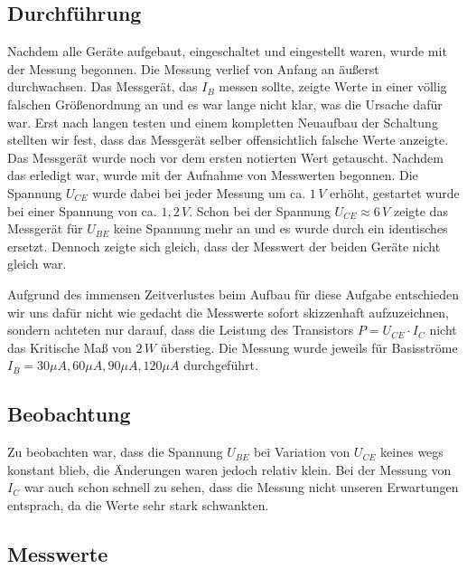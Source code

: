 \subsection{Durchführung}
Nachdem alle Geräte aufgebaut, eingeschaltet und eingestellt waren, wurde mit der Messung begonnen. Die Messung verlief von Anfang an äußerst durchwachsen. Das Messgerät, das \(I_B\) messen sollte, zeigte Werte in einer völlig falschen Größenordnung an und es war lange nicht klar, was die Ursache dafür war. Erst nach langen testen und einem kompletten Neuaufbau der Schaltung stellten wir fest, dass das Messgerät selber offensichtlich falsche Werte anzeigte. Das Messgerät wurde noch vor dem ersten notierten Wert getauscht. Nachdem das erledigt war, wurde mit der Aufnahme von Messwerten begonnen. Die Spannung \(U_{CE}\) wurde dabei bei jeder Messung um ca. \(1\,V\) erhöht, gestartet wurde bei einer Spannung von ca. \(1,2\,V\). Schon bei der Spannung \(U_{CE} \approx 6\,V\) zeigte das Messgerät für \(U_{BE}\) keine Spannung mehr an und es wurde durch ein identisches ersetzt. Dennoch zeigte sich gleich, dass der Messwert der beiden Geräte nicht gleich war. 

Aufgrund des immensen Zeitverlustes beim Aufbau für diese Aufgabe entschieden wir uns dafür nicht wie gedacht die Messwerte sofort skizzenhaft aufzuzeichnen, sondern achteten nur darauf, dass die Leistung des Transistors 
\(P = U_{CE} \cdot I_C \) nicht das Kritische Maß von \(2\,W\) überstieg. Die Messung wurde jeweils für Basisströme 
\(I_B = 30 \mu A, 60 \mu A, 90 \mu A, 120 \mu A\) durchgeführt.

\subsection{Beobachtung}
Zu beobachten war, dass die Spannung \(U_{BE}\) bei Variation von \(U_{CE}\) keines wegs konstant blieb, die Änderungen waren jedoch relativ klein. Bei der Messung von \(I_{C}\) war auch schon schnell zu sehen, dass die Messung nicht unseren Erwartungen entsprach, da die Werte sehr stark schwankten.

\subsection{Messwerte}
\begin{center}

\vspace{0.4cm}


\vspace{0.35cm}


\vspace{0.35cm}


\vspace{0.35cm}
\end{center}
